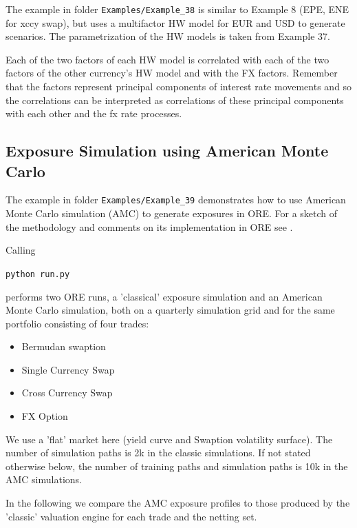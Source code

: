 The example in folder {\tt Examples/Example\_38} is similar to Example 8 (EPE, ENE for xccy swap), but uses a
multifactor HW model for EUR and USD to generate scenarios. The parametrization of the HW models is taken from Example
37.

Each of the two factors of each HW model is correlated with each of the two factors of the other currency's HW model and
with the FX factors. Remember that the factors represent principal components of interest rate movements and so the
correlations can be interpreted as correlations of these principal components with each other and the fx rate processes.

\subsection{Exposure Simulation using American Monte Carlo}%
\label{example:39}

The example in folder {\tt Examples/Example\_39} demonstrates how to use American Monte Carlo simulation (AMC) to generate exposures in ORE.
For a sketch of the methodology and comments on its implementation in ORE see \cite{methods}.

Calling

\medskip
\centerline {\tt python run.py}

\medskip
performs two ORE runs, a 'classical' exposure simulation and an American Monte Carlo simulation, both on a quarterly simulation grid and for the same portfolio consisting of four trades:

\begin{itemize}
\item Bermudan swaption
\item Single Currency Swap
\item Cross Currency Swap
\item FX Option
\end{itemize}

We use a 'flat' market here (yield curve and Swaption volatility surface). The number of simulation paths is 2k in the classic simulations. If not stated otherwise below, the number of training paths and simulation paths is 10k in the AMC simulations.

In the following we compare the AMC exposure profiles to those produced by the 'classic' valuation engine for each trade and the netting set.


